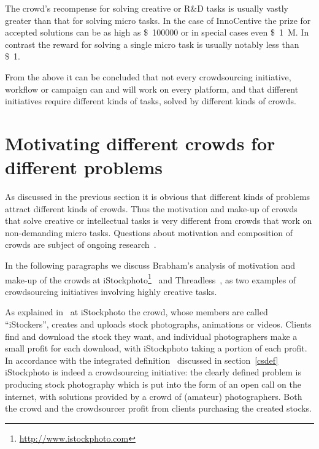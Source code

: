 \documentclass{sig-alternate}
\begin{document}
The crowd's recompense for solving creative or R\&D tasks is usually vastly
greater than that for solving micro tasks. In the case of InnoCentive the prize
for accepted solutions can be as high as \SI{100000}[\$]{} or in special cases
even \SI{1}[\$]{M}. In contrast the reward for solving a single micro
task is usually notably less than \SI{1}[\$]{}.

From the above it can be concluded that not every crowdsourcing initiative,
workflow or campaign can and will work on every platform, and that different
initiatives require different kinds of tasks, solved by different kinds of
crowds. 

\section{Motivating different crowds for different problems}

As discussed in the previous section it is obvious that different kinds of
problems attract different kinds of crowds. Thus the motivation and make-up of
crowds that solve creative or intellectual tasks is very different from crowds
that work on non-demanding micro tasks. Questions about motivation and
composition of crowds are subject of ongoing
research~\cite{antikainen2010motivating, brabham2008moving, brabham2010moving,
	chandler2013breaking, horton2010labor, kaufmann2011more,
	mason2010financial}.

In the following paragraphs we discuss Brabham's analysis of motivation and
make-up of the crowds at
iStockphoto\footnote{\url{http://www.istockphoto.com}}~\cite{brabham2008moving}
and Threadless~\cite{brabham2010moving}, as two examples of crowdsourcing
initiatives involving highly creative tasks. 

As explained in~\cite{brabham2008moving} at iStockphoto the crowd, whose
members are called ``iStockers'', creates and uploads stock photographs,
animations or videos.  Clients find and download the stock they want, and
individual photographers make a small profit for each download, with
iStockphoto taking a portion of each profit. In accordance with the integrated
definition~\cite{estelles2012towards} discussed in section~\ref{csdef}
iStockphoto is indeed a crowdsourcing initiative: the clearly defined problem is
producing stock photography which is put into the form of an open call on the
internet, with solutions provided by a crowd of (amateur) photographers. Both
the crowd and the crowdsourcer profit from clients purchasing the created
stocks.
\end{document}

